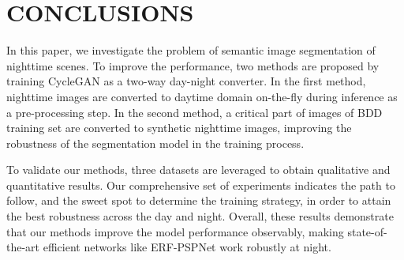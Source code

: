 \documentclass[a4paper]{spie}
\begin{document}
\section{CONCLUSIONS}

In this paper, we investigate the problem of semantic image segmentation of nighttime scenes. To improve the performance, two methods are proposed by training CycleGAN as a two-way day-night converter. In the first method, nighttime images are converted to daytime domain on-the-fly during inference as a pre-processing step. In the second method, a critical part of images of BDD training set are converted to synthetic nighttime images, improving the robustness of the segmentation model in the training process.

To validate our methods, three datasets are leveraged to obtain qualitative and quantitative results. Our comprehensive set of experiments indicates the path to follow, and the sweet spot to determine the training strategy, in order to attain the best robustness across the day and night. Overall, these results demonstrate that our methods improve the model performance observably, making state-of-the-art efficient networks like ERF-PSPNet work robustly at night.

   


  
\end{document}
